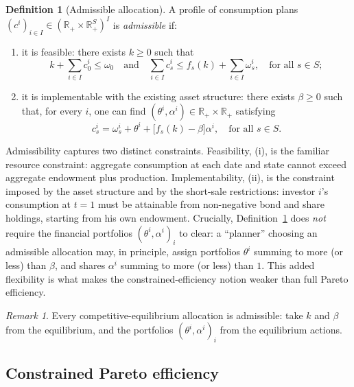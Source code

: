 \documentclass[11pt,a4paper,oneside]{book}
\def\R{\mathbb{R}}
\def\leq{\leqslant}
\def\geq{\geqslant}
\def\et{\quad \text{and} \quad}
\theoremstyle{plain}
\theoremstyle{definition}
\newtheorem{definition}[theorem]{Definition}
\theoremstyle{remark}
\newtheorem{remark}[theorem]{Remark}
\numberwithin{equation}{chapter}
\begin{document}
\begin{definition}[Admissible allocation]\label{def:admissible-alloc}
A profile of consumption plans $(c^i)_{i \in I} \in (\R_+ \times \R_+^S)^I$ is \emph{admissible} if:
\begin{enumerate}
  \item[\textup{(i)}] it is feasible: there exists $k \geq 0$ such that
  \begin{equation*}
    k + \sum_{i \in I} c^i_0 \leq \omega_0
    \et
    \sum_{i \in I} c^i_s \leq f_s(k) + \sum_{i \in I} \omega^i_s, \quad \text{for all $s\in S$};
  \end{equation*}
  \item[\textup{(ii)}] it is implementable with the existing asset structure: there exists $\beta \geq 0$ such that, for every $i$, one can find $(\theta^i, \alpha^i) \in \R_+ \times \R_+$ satisfying
  \begin{equation*}
    c^i_s = \omega^i_s + \theta^i + \bigl[ f_s(k) - \beta \bigr] \alpha^i, \quad \text{for all $s\in S$}.
  \end{equation*}
\end{enumerate}
\end{definition}

Admissibility captures two distinct constraints.
Feasibility, (i), is the familiar resource constraint: aggregate consumption at each date and state cannot exceed aggregate endowment plus production.
Implementability, (ii), is the constraint imposed by the asset structure and by the short-sale restrictions: investor $i$'s consumption at $t=1$ must be attainable from non-negative bond and share holdings, starting from his own endowment.
Crucially, Definition~\ref{def:admissible-alloc} does \emph{not} require the financial portfolios $(\theta^i, \alpha^i)_{i}$ to clear: a ``planner'' choosing an admissible allocation may, in principle, assign portfolios $\theta^i$ summing to more (or less) than $\beta$, and shares $\alpha^i$ summing to more (or less) than $1$.
This added flexibility is what makes the constrained-efficiency notion weaker than full Pareto efficiency.

\begin{remark}\label{rem:eq-is-admissible}
Every competitive-equilibrium allocation is admissible: take $k$ and $\beta$ from the equilibrium, and the portfolios $(\theta^i, \alpha^i)_i$ from the equilibrium actions.
\end{remark}

\subsection{Constrained Pareto efficiency}
\end{document}
